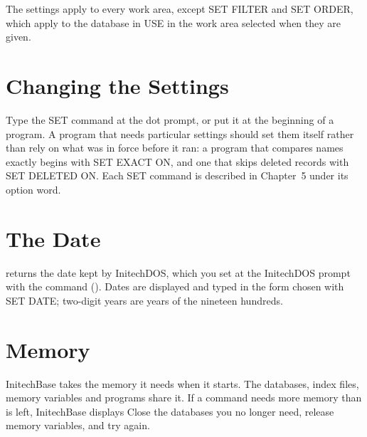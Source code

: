 The settings apply to every work area, except SET FILTER and SET ORDER, which
apply to the database in USE in the work area selected when they are given.

\section{Changing the Settings}
Type the SET command at the dot prompt, or put it at the beginning of a
program.  A program that needs particular settings should set them itself
rather than rely on what was in force before it ran: a program that compares
names exactly begins with SET EXACT ON, and one that skips deleted records
with SET DELETED ON.  Each SET command is described in Chapter~5 under its
option word.

\section{The Date}
 returns the date kept by InitechDOS, which you set at the
InitechDOS prompt with the command  ().  Dates are displayed and typed in the form chosen with SET DATE;
two-digit years are years of the nineteen hundreds.

\section{Memory}
InitechBase takes the memory it needs when it starts.  The databases, index
files, memory variables and programs share it.  If a command needs more memory
than is left, InitechBase displays   Close the
databases you no longer need, release memory variables, and try again.
